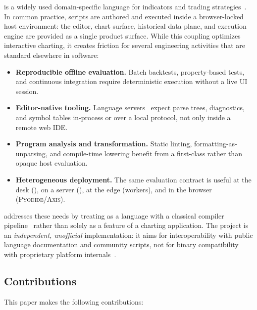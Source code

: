 \documentclass[11pt,a4paper]{article}
\begin{document}
\pine{} is a widely used domain-specific language for indicators and trading
strategies~\citep{tradingview-pine,murphy1999technical}.
In common practice, scripts are authored and executed inside a browser-locked
host environment: the editor, chart surface, historical data plane, and
execution engine are provided as a single product surface.
While this coupling optimizes interactive charting, it creates friction for
several engineering activities that are standard elsewhere in software:

\begin{itemize}[leftmargin=1.2em]
  \item \textbf{Reproducible offline evaluation.}
    Batch backtests, property-based tests, and continuous integration require
    deterministic execution without a live UI session.
  \item \textbf{Editor-native tooling.}
    Language servers~\citep{lsp2023,voutilainen2016lsp} expect parse trees,
    diagnostics, and symbol tables in-process or over a local protocol, not
    only inside a remote web IDE.
  \item \textbf{Program analysis and transformation.}
    Static linting, formatting-as-unparsing, and compile-time lowering benefit
    from a first-class \ast{} rather than opaque host evaluation.
  \item \textbf{Heterogeneous deployment.}
    The same evaluation contract is useful at the desk (\cli{}), on a
    server (\api{}), at the edge (workers), and in the browser
    (\textsc{Pyodide}/\textsc{Axis}).
\end{itemize}

\pyne{} addresses these needs by treating \pine{} as a language with a
classical compiler pipeline~\citep{aho2006dragon,cooper2011engineering,nystrom2021crafting}
rather than solely as a feature of a charting application.
The project is an \emph{independent, unofficial} implementation: it aims for
interoperability with public language documentation and community scripts, not
for binary compatibility with proprietary platform internals~\citep{pynescript2026,hoox2026}.

\subsection{Contributions}
\label{sec:contributions}

This paper makes the following contributions:
\end{document}

